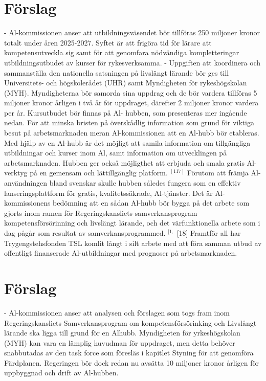 {\section*{Förslag}
- Al-kommissionen anser att utbildningsväsendet bör tillföras 250 miljoner kronor totalt under åren 2025-2027. Syftet är att frigöra tid för lärare att kompetensutveckla sig samt för att genomfara nödvändiga kompletteringar utbildningsutbudet av kurser för rykesverksamma.
- Uppgiften att koordinera och sammanställa den nationella satsningen på livslängt lärande bör ges till Universitets- och högskolerådet (UHR) samt Myndigheten för rykeshögskolan (MYH). Myndigheterna bör samorda sina uppdrag och
de bör vardera tillföras 5 miljoner kronor årligen i två år för uppdraget, därefter 2 miljoner kronor vardera per år. Kursutbudet bör finnas på Al- hubben, som presenteras mer ingående nedan.
För att minska bristen på överskådlig information som grund för viktiga besut på arbetsmarknaden meran Al-kommissionen att en Al-hubb bör etableras. Med hjälp av en Al-hubb är det möjligt att samila information om tillgängliga utbildningar och kurser inom Al, samt information om utvecklingen på arbetsmarknaden. Hubben ger också möjligthet att erbjuda och smala gratis Al-verktyg på en gemensam och lättillgänglig platform. \({ }^{[117]}\) Förutom att främja Al-användningen bland svenskar skulle hubben således fungera som en effektiv lanseringsplattform för gratis, kvalitetssäkrade, Al-tjänster.
Det är Al-kommissionens bedömning att en sådan Al-hubb bör bygga på det arbete som gjorts inom ramen för Regeringskansliets samverkansprogram kompetensförsörinning och livslängt lärande, och det värfunktionella arbete som i dag pågår som resultat av samverkansprogrammed. \({ }^{[1,}\) [18] Framtför all har Trygengstehsfonden TSL komlit långt i silt arbete med att föra samman utbud av offentligt finanserade Al-utbildningar med prognoser på arbetsmarknaden.
\section*{Förslag}
- Al-kommissionen anser att analysen och förslagen som togs fram inom Regeringskansliets Samverkansprogram om kompetensförsörinking och Livslångt lärande ska ligga till grund för en Alhubb. Myndigheten för yrkeshögskolan (MYH) kan vara en lämplig huvudman för uppdraget, men detta behöver snabbutadas av den task force som föresläs i kapitlet Styning för att genomföra Färdplanen. Regeringen bör dock redan nu avsätta 10 miljoner kronor årligen för uppbyggnad och drift av Al-hubben.
}
